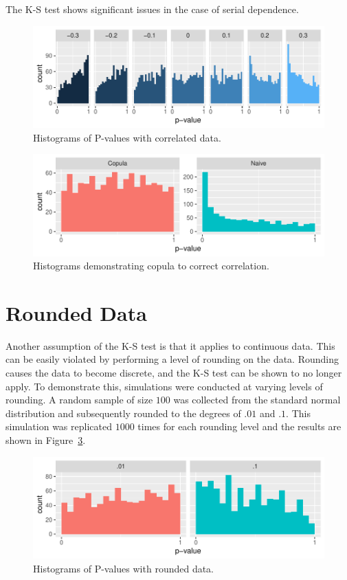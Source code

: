 \documentclass[12pt, letterpaper, titlepage]{article}
\begin{document}
The K-S test shows significant issues in the case of serial dependence.

\begin{figure}[tbp]
  \centering
  \includegraphics{hist_correlation}
  \caption{Histograms of P-values with correlated data.}
  \label{fig:hist_correlation}
\end{figure}

\begin{figure}[tbp]
  \centering
  \includegraphics{hist_copula}
  \caption{Histograms demonstrating copula to correct correlation.}
  \label{fig:hist_copula}
\end{figure}

\hypertarget{sec:rounded}{%
\section{Rounded Data}\label{sec:rounded}}

Another assumption of the K-S test is that it applies to continuous data. This can be easily violated by performing a level of rounding on the data. Rounding causes the data to become discrete, and the K-S test can be shown to no longer apply. To demonstrate this, simulations were conducted at varying levels of rounding. A random sample of size $100$ was collected from the standard normal distribution and subsequently rounded to the degrees of $.01$ and  $.1$. This simulation was replicated $1000$ times for each rounding level and the results are shown in Figure~\ref{fig:hist_rounded}.

\begin{figure}[tbp]
  \centering
  \includegraphics{hist_rounded}
  \caption{Histograms of P-values with rounded data.}
  \label{fig:hist_rounded}
\end{figure}
\end{document}
